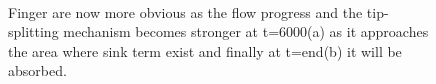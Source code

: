 \documentclass[preprint,authoryear,12pt]{elsarticle}
\begin{document}
\begin{figure}
\centering
{}\\[2mm]%
%
\caption{Finger are now more obvious as the flow progress and the tip-splitting mechanism becomes stronger at t=6000(a) as it approaches the area where sink term exist and finally at t=end(b) it will be absorbed.}
\label{fig:2c_homoheleshaw_10}
\end{figure}
\end{document}
